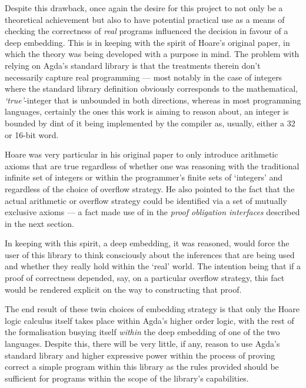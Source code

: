 \documentclass[oneside,12pt]{article}
\begin{document}
\pagebreak

Despite this drawback, once again the desire for this project to not only be a theoretical achievement but also to have potential practical use as a means of checking the correctness of \emph{real} programs influenced the decision in favour of a deep embedding. This is in keeping with the spirit of Hoare's original paper, in which the theory was being developed with a purpose in mind. The problem with relying on Agda's standard library is that the treatments therein don't necessarily capture real programming --- most notably in the case of integers where the standard library definition obviously corresponds to the mathematical, \emph{`true'}-integer that is unbounded in both directions, whereas in most programming languages, certainly the ones this work is aiming to reason about, an integer is bounded by dint of it being implemented by the compiler as, usually, either a 32 or 16-bit word.

Hoare was very particular in his original paper to only introduce \mbox{arithmetic} axioms that are true regardless of whether one was reasoning with the traditional infinite set of integers or within the programmer's finite sets of `integers' and regardless of the choice of overflow strategy. He also pointed to the fact that the actual arithmetic or overflow strategy could be identified via a set of mutually exclusive axioms --- a fact made use of in the \emph{proof obligation interfaces} described in the next section.

In keeping with this spirit, a deep embedding, it was reasoned, would force the user of this library to think consciously about the inferences that are being used and whether they really hold within the `real' world. The intention being that if a proof of correctness depended, say, on a particular overflow strategy, this fact would be rendered explicit on the way to constructing that proof.

The end result of these twin choices of embedding strategy is that only the Hoare logic calculus itself takes place within Agda's higher order logic, with the rest of the formalisation busying itself \emph{within} the deep embedding of one of the two languages. Despite this, there will be very little, if any, reason to use Agda's standard library and higher expressive power within the process of proving correct a simple program within this library as the rules provided should be sufficient for programs within the scope of the library's capabilities.


\pagebreak
\end{document}
